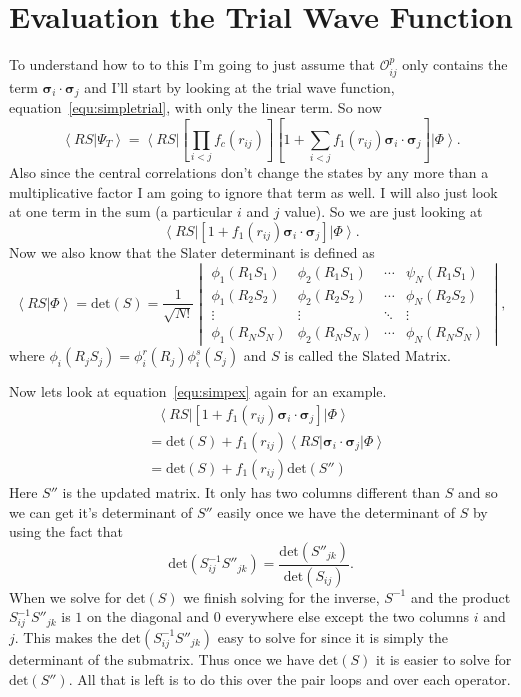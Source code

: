 \documentclass[12pt]{extarticle}
\newcommand{\Oijp}{\mathcal{O}^p_{ij}}
\newcommand{\ket}[1]{\left| #1 \right>}
\newcommand{\bra}[1]{\left< #1 \right|}
\newcommand{\braket}[2]{\left< #1 | #2 \right>}
\newcommand{\sigmai}{\bm{\sigma}_i}
\newcommand{\sigmaj}{\bm{\sigma}_j}
\newcommand{\sigmaij}{\sigmai \cdot \sigmaj}
\begin{document}
\section{Evaluation the Trial Wave Function}
To understand how to to this I'm going to just assume that $\Oijp$ only contains the term $\sigmaij$ and I'll start by looking at the trial wave function, equation~\ref{equ:simpletrial}, with only the linear term. So now
\begin{equation}
  \braket{RS}{\Psi_T} = \bra{RS} \left[ \prod_{i<j}f_c(r_{ij}) \right] \left[ 1+\sum_{i<j} f_1(r_{ij})\sigmaij \right] \ket{\Phi}.
\end{equation}
Also since the central correlations don't change the states by any more than a multiplicative factor I am going to ignore that term as well. I will also just look at one term in the sum (a particular $i$ and $j$ value). So we are just looking at
\begin{equation}
  \bra{RS} \left[ 1+f_1(r_{ij})\sigmaij \right] \ket{\Phi}.
  \label{equ:simpex}
\end{equation}
Now we also know that the Slater determinant is defined as
\begin{equation}
  \braket{RS}{\Phi} = \mathrm{det}(S) = \frac{1}{\sqrt{N!}} \begin{vmatrix}
  \phi_1(R_1S_1) & \phi_2(R_1S_1) & \cdots & \psi_N(R_1S_1) \\ 
  \phi_1(R_2S_2) & \phi_2(R_2S_2) & \cdots & \phi_N(R_2S_2) \\
  \vdots & \vdots & \ddots &\vdots \\
  \phi_1(R_NS_N)& \phi_2(R_NS_N) & \cdots & \phi_N(R_NS_N) \end{vmatrix},
\end{equation}
where $\phi_i(R_jS_j)=\phi^r_i(R_j)\phi^s_i(S_j)$ and $S$ is called the Slated Matrix.

Now lets look at equation~\ref{equ:simpex} again for an example.
\begin{align}
  & ~ ~ ~ \bra{RS} \left[ 1+f_1(r_{ij})\sigmaij \right] \ket{\Phi} \\
  &= \mathrm{det}(S) + f_1(r_{ij}) \bra{RS}\sigmaij\ket{\Phi} \\
  &= \mathrm{det}(S) + f_1(r_{ij})\mathrm{det}(S'')
\end{align}
Here $S''$ is the updated matrix. It only has two columns different than $S$ and so we can get it's determinant of $S''$ easily once we have the determinant of $S$ by using the fact that
\begin{equation}
  \mathrm{det}(S^{-1}_{ij} S''_{jk}) = \frac{\mathrm{det}(S''_{jk})}{\mathrm{det}(S_{ij})}.
\end{equation}
When we solve for $\mathrm{det}(S)$ we finish solving for the inverse, $S^{-1}$ and the product $S^{-1}_{ij}S''_{jk}$ is $1$ on the diagonal and $0$ everywhere else except the two columns $i$ and $j$. This makes the $\mathrm{det}(S^{-1}_{ij}S''_{jk})$ easy to solve for since it is simply the determinant of the submatrix. Thus once we have $\mathrm{det}(S)$ it is easier to solve for $\mathrm{det}(S'')$. All that is left is to do this over the pair loops and over each operator.
\end{document}

